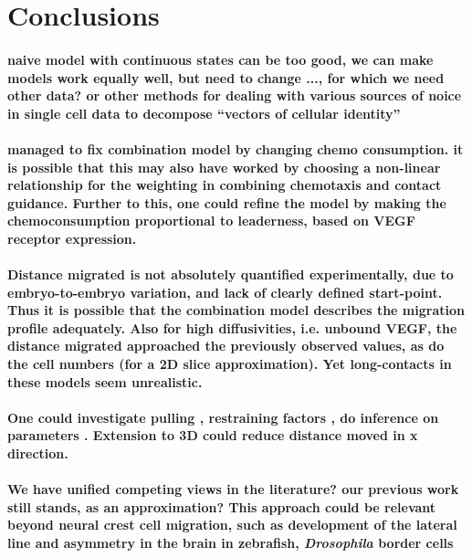 \documentclass[review]{elsarticle}
\begin{document}
\section{Conclusions}
\paragraph{naive model with continuous states can be too good, we can make models work equally well, but need to change ..., for which we need other data? or other methods for dealing with various sources of noice in single cell data to decompose ``vectors of cellular identity'' \cite{Wagner2016}}

\paragraph{managed to fix combination model by changing chemo consumption. it is possible that this may also have worked by choosing a non-linear relationship for the weighting in combining chemotaxis and contact guidance. Further to this, one could refine the model by making the chemoconsumption proportional to leaderness, based on VEGF receptor expression.}

\paragraph{Distance migrated is not absolutely quantified experimentally, due to embryo-to-embryo variation, and lack of clearly defined start-point. Thus it is possible that the combination model describes the migration profile adequately. Also for high diffusivities, i.e. unbound VEGF, the distance migrated approached the previously observed values, as do the cell numbers (for a 2D slice approximation). Yet long-contacts in these models seem unrealistic.}

\paragraph{ One could investigate pulling \cite{Yates2018}, restraining factors \cite{McLennan2017}, do inference on parameters \cite{Ross2017}. Extension to 3D could reduce distance moved in x direction.}

\paragraph{We have unified competing views in the literature? our previous work still stands, as an approximation? This approach could be relevant beyond neural crest cell migration, such as development of the lateral line \cite{Dona2013} and asymmetry in the brain \cite{Roussigne2018} in zebrafish, \textsl{Drosophila} border cells \cite{Inaki2012}}
\end{document}
